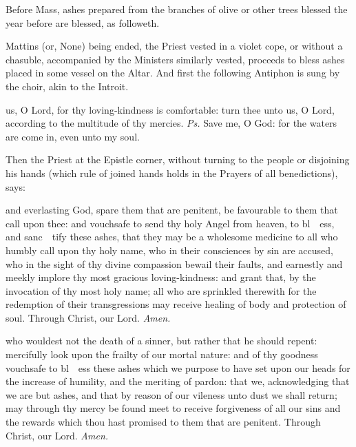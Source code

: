 \begin{rubric}
    Before Mass, ashes prepared from the branches of olive or other trees blessed the year before are blessed, as followeth.
\end{rubric}
\begin{rubric}
Mattins (or, None) being ended, the Priest vested in a violet cope, or without a chasuble, accompanied by the Ministers similarly vested, proceeds to bless ashes placed in some vessel on the Altar. And first the following Antiphon is sung by the choir, akin to the Introit.
\end{rubric}
 us, O Lord, for thy loving-kindness is comfortable: turn thee unto us, O Lord, according to the multitude of thy mercies. \textit{Ps.} Save me, O God: for the waters are come in, even unto my soul.
\begin{rubric}
    Then the Priest at the Epistle corner, without turning to the people or disjoining his hands (which rule of joined hands holds in the Prayers of all benedictions), says:
\end{rubric}
{} and everlasting God, spare them that are penitent, be favourable to them that call upon thee: and vouchsafe to send thy holy Angel from heaven, to bl~{}~ess, and sanc~{}~tify these ashes, that they may be a wholesome medicine to all who humbly call upon thy holy name, who in their consciences by sin are accused, who in the sight of thy divine compassion bewail their faults, and earnestly and meekly implore thy most gracious loving-kindness: and grant that, by the invocation of thy most holy name; all who are sprinkled therewith for the redemption of their transgressions may receive healing of body and protection of soul. Through Christ, our Lord. \textit{Amen.}

{} who wouldest not the death of a sinner, but rather that he should repent: mercifully look upon the frailty of our mortal nature: and of thy goodness vouchsafe to bl~{}~ess these ashes which we purpose to have set upon our heads for the increase of humility, and the meriting of pardon: that we, acknowledging that we are but ashes, and that by reason of our vileness unto dust we shall return; may through thy mercy be found meet to receive forgiveness of all our sins and the rewards which thou hast promised to them that are penitent. Through Christ, our Lord. \textit{Amen.}

